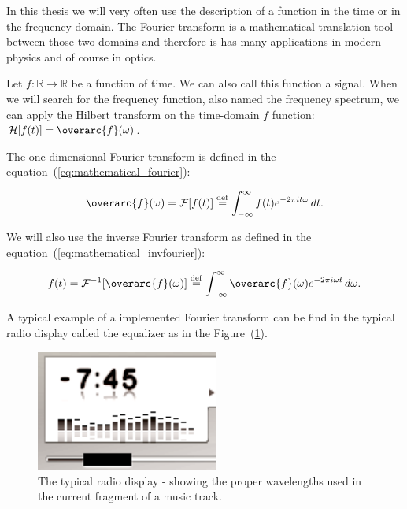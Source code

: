 \documentclass[12pt,twoside,a4paper]{article}
\numberwithin{equation}{subsection}
\numberwithin{figure}{subsection}
\begin{document}
In this thesis we will very often use the description of a function in the time or in the frequency domain. The Fourier transform is a
mathematical translation tool between those two domains and therefore is has many applications in modern physics and of course in optics.

Let $f : \mathbb{R} \to \mathbb{R} $ be a function of time. We can also call this function a signal. When we will search for the frequency
function, also named the frequency spectrum, we can apply the Hilbert transform on the time-domain $ f $ function: $ \mathcal{H}[f(t)] = 
\overarc{f}(\omega) $.

The one-dimensional Fourier transform is defined in the equation~(\ref{eq:mathematical_fourier}):

\begin{equation} \label{eq:mathematical_fourier}
  \overarc{f}(\omega) = \mathcal{F}[f(t)] \stackrel{\mathrm{def}}{=} \int_{- \infty} ^ {\infty} f(t) e ^{-2 \pi i t \omega} \, dt .
\end{equation}

We will also use the inverse Fourier transform as defined in the equation~(\ref{eq:mathematical_invfourier}):

\begin{equation} \label{eq:mathematical_invfourier}
  f(t) = \mathcal{F}^{-1}[\overarc{f}(\omega)] \stackrel{\mathrm{def}}{=} \int_{- \infty} ^ {\infty} \overarc{f}(\omega) e ^{-2 \pi i
  \omega t} \, d\omega .
\end{equation}

A typical example of a implemented Fourier transform can be find in the typical radio display called the equalizer as in the
Figure~(\ref{fig:mathematical_equalizer}).

\begin{figure} 
	\begin{center}
 		\includegraphics[width=60mm]{img/equalizer.png}
 		\caption{The typical radio display - showing the proper wavelengths used in the current fragment of a music track.
 		\label{fig:mathematical_equalizer}}
	\end{center}
\end{figure} 
\end{document}
